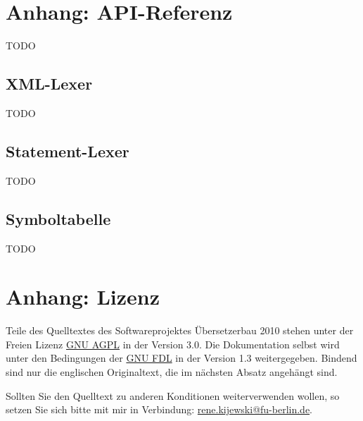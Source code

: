\documentclass[10pt,a4paper,ngerman,titlepage,tocindentauto]{article}
\begin{document}
	\newpage
	\section{Anhang: API-Referenz}
		TODO
	
		\subsection{XML-Lexer}
			TODO
	
		\subsection{Statement-Lexer}
			TODO
	
		\subsection{Symboltabelle}
			TODO
	
	\newpage
	\section{Anhang: Lizenz}
		Teile des Quelltextes des Softwareprojektes Übersetzerbau 2010 stehen unter der Freien
		Lizenz \href{http://www.gnu.org/licenses/agpl-3.0.html}{GNU AGPL} in der Version 3.0.
		Die Dokumentation selbst wird unter den Bedingungen der \href{http://www.gnu.org/licenses/fdl-1.3.html}{GNU FDL}
		in der Version 1.3 weitergegeben.
		Bindend sind nur die englischen Originaltext, die im nächsten Absatz angehängt sind.
		
		Sollten Sie den Quelltext zu anderen Konditionen weiterverwenden wollen, so setzen Sie
		sich bitte mit mir in Verbindung:
		\href{mailto:rene.kijewski@fu-berlin.de?subject=[SWP_CP_2010]}{rene.kijewski@fu-berlin.de}.
		
\end{document}
